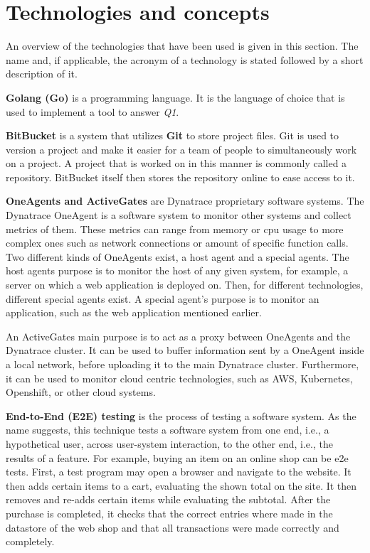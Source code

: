 \chapter{Technologies and concepts}\label{ch:technologies-used}

An overview of the technologies that have been used is given in this section.
The name and, if applicable, the acronym of a technology is stated followed by a short description of it.

\textbf{Golang (Go)}\cite{golang} is a programming language.
It is the language of choice that is used to implement a tool to answer \textit{Q1}.

\textbf{BitBucket}\cite{bitbucket} is a system that utilizes \textbf{Git}\cite{git} to store project files.
Git is used to version a project and make it easier for a team of people to simultaneously work on a project.
A project that is worked on in this manner is commonly called a repository.
BitBucket itself then stores the repository online to ease access to it.

\textbf{OneAgents and ActiveGates}\cite{oneagents,activegates} are Dynatrace proprietary software systems.
The Dynatrace OneAgent\cite{oneagents} is a software system to monitor other systems and collect metrics of them.
These metrics can range from memory or cpu usage to more complex ones such as network connections or amount of specific function calls.
Two different kinds of OneAgents exist, a host agent and a special agents.
The host agents purpose is to monitor the host of any given system, for example, a server on which a web application is deployed on.
Then, for different technologies, different special agents exist.
A special agent's purpose is to monitor an application, such as the web application mentioned earlier.

An ActiveGates\cite{activegates} main purpose is to act as a proxy between OneAgents and the Dynatrace cluster.
It can be used to buffer information sent by a OneAgent inside a local network, before uploading it to the main Dynatrace cluster.
Furthermore, it can be used to monitor cloud centric technologies, such as AWS, Kubernetes, Openshift, or other cloud systems.

\textbf{End-to-End (E2E) testing}\cite{end-to-end-integration-testing-design} is the process of testing a software system.
As the name suggests, this technique tests a software system from one end, i.e., a hypothetical user, across user-system interaction, to the other end, i.e., the results of a feature.
For example, buying an item on an online shop can be e2e tests.
First, a test program may open a browser and navigate to the website.
It then adds certain items to a cart, evaluating the shown total on the site.
It then removes and re-adds certain items while evaluating the subtotal.
After the purchase is completed, it checks that the correct entries where made in the datastore of the web shop and that all transactions were made correctly and completely.

